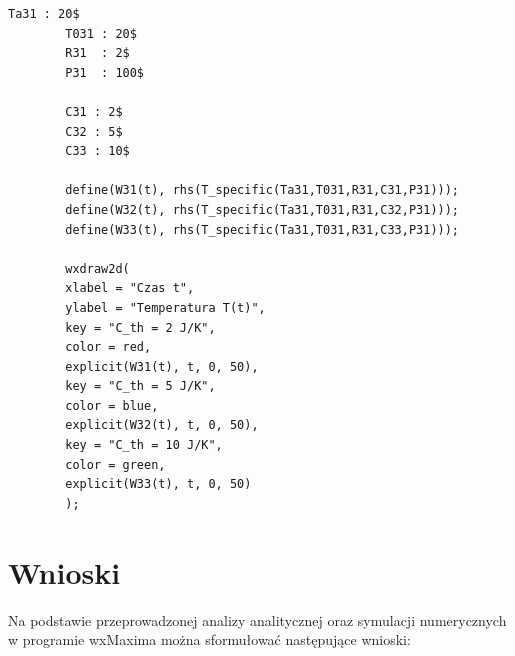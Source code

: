 \documentclass[a4paper,12pt]{article}
\begin{document}
	\begin{lstlisting}[caption={Wpływ pojemności cieplnej na nagrzewanie}]
		Ta31 : 20$
		T031 : 20$
		R31  : 2$
		P31  : 100$
		
		C31 : 2$
		C32 : 5$
		C33 : 10$
		
		define(W31(t), rhs(T_specific(Ta31,T031,R31,C31,P31)));
		define(W32(t), rhs(T_specific(Ta31,T031,R31,C32,P31)));
		define(W33(t), rhs(T_specific(Ta31,T031,R31,C33,P31)));
		
		wxdraw2d(
		xlabel = "Czas t",
		ylabel = "Temperatura T(t)",
		key = "C_th = 2 J/K",
		color = red,
		explicit(W31(t), t, 0, 50),
		key = "C_th = 5 J/K",
		color = blue,
		explicit(W32(t), t, 0, 50),
		key = "C_th = 10 J/K",
		color = green,
		explicit(W33(t), t, 0, 50)
		);
	\end{lstlisting}
		
	
	
	\section{Wnioski}
	
	Na podstawie przeprowadzonej analizy analitycznej oraz symulacji numerycznych w programie wxMaxima można sformułować następujące wnioski:
	
\end{document}
